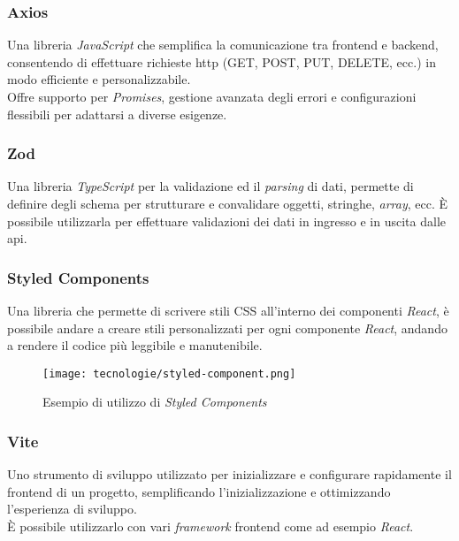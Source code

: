 \subsubsection{Axios}

Una libreria \textit{JavaScript} che semplifica la comunicazione tra frontend e backend, consentendo di effettuare richieste \gls{http} (GET, POST, PUT, DELETE, ecc.) in modo efficiente e personalizzabile. \\
Offre supporto per \textit{Promises}, gestione avanzata degli errori e configurazioni flessibili per adattarsi a diverse esigenze.

\subsubsection{Zod}

Una libreria \textit{TypeScript} per la validazione ed il \textit{parsing} di dati, permette di definire degli schema per strutturare e convalidare oggetti, stringhe, \textit{array}, ecc.
È possibile utilizzarla per effettuare validazioni dei dati in ingresso e in uscita dalle \gls{api}.
\subsubsection{Styled Components}

Una libreria che permette di scrivere stili CSS all’interno dei componenti \textit{React}, è possibile andare a creare stili personalizzati per ogni componente \textit{React}, andando a rendere il codice più leggibile e manutenibile.

\begin{figure}[H]
    \label{fig:styled-components}
    \centering
    \texttt{[image: tecnologie/styled-component.png]}
    \caption{Esempio di utilizzo di \textit{Styled Components}}
    \cite{site:medium}
\end{figure}

\subsubsection{Vite}

Uno strumento di sviluppo utilizzato per inizializzare e configurare rapidamente il \gls{frontend} di un progetto, semplificando l'inizializzazione e ottimizzando l'esperienza di sviluppo.\\
È possibile utilizzarlo con vari \textit{framework} \gls{frontend} come ad esempio \textit{React}.

